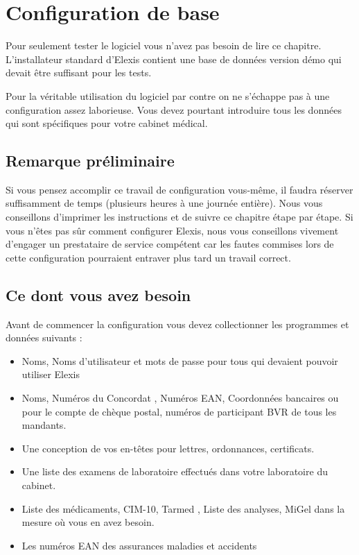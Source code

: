 %


\section{Configuration de base}
Pour seulement tester le logiciel vous n'avez pas besoin de lire ce chapitre. L'installateur standard d'Elexis contient une base de données version démo qui devait être suffisant pour les tests.

Pour la véritable utilisation du logiciel par contre on ne s'échappe pas à une configuration assez laborieuse. Vous devez pourtant introduire tous les données qui sont spécifiques pour votre cabinet médical.

\subsection{Remarque préliminaire}
Si vous pensez accomplir ce travail de configuration vous-même, il faudra réserver suffisamment de temps (plusieurs heures à une journée entière). Nous vous conseillons d'imprimer les instructions et de suivre ce chapitre étape par étape. Si vous n'êtes pas sûr comment configurer Elexis, nous vous conseillons vivement d'engager un prestataire de service compétent car les fautes commises lors de cette configuration pourraient entraver plus tard un travail correct.

\subsection{Ce dont vous avez besoin}
Avant de commencer la configuration vous devez collectionner les programmes et données suivants :
\begin{itemize}
  \item Noms, Noms d'utilisateur et mots de passe pour tous qui devaient pouvoir utiliser Elexis
  \item Noms, Numéros du Concordat , Numéros EAN, Coordonnées bancaires ou pour le compte de chèque postal, numéros de participant BVR de tous les mandants.
  \item Une conception de vos en-têtes pour lettres, ordonnances, certificats.
  \item Une liste des examens de laboratoire effectués dans votre laboratoire du cabinet.
  \item Liste des médicaments, CIM-10, Tarmed , Liste des analyses, MiGel dans la mesure où vous en avez besoin.
  \item Les numéros EAN des assurances maladies et accidents
\end{itemize}

